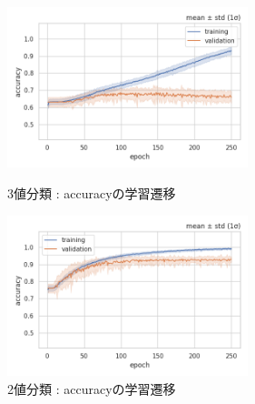 \documentclass[a4j, 11pt]{jreport}
\begin{document}
\begin{figure}[htbp]
  \begin{minipage}[b]{0.45\hsize}
    \centering
    \includegraphics[keepaspectratio, width=7cm]{images/accs_ex4-1.png}
    \caption{3値分類 : accuracyの学習遷移}
		\label{fig:accs_ex4-1}
  \end{minipage}
  \begin{minipage}[b]{0.45\hsize}
    \centering
    \includegraphics[keepaspectratio, width=7cm]{images/accs_ex4-2.png}
    \caption{2値分類 : accuracyの学習遷移}
		\label{fig:accs_ex4-2}
  \end{minipage}
\end{figure}

\newpage
\end{document}
